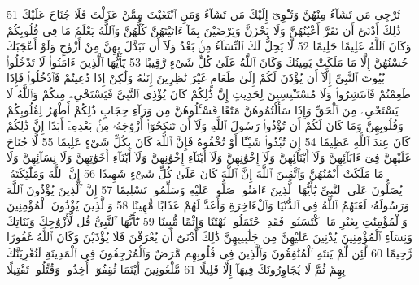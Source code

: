 {\tiny\colorbox{cl_aya}{51}} تُرْجِى مَن تَشَآءُ مِنْهُنَّ وَتُـْٔوِىٓ إِلَيْكَ مَن تَشَآءُ وَمَنِ ٱبْتَغَيْتَ مِمَّنْ عَزَلْتَ فَلَا جُنَاحَ عَلَيْكَ ذَٰلِكَ أَدْنَىٰٓ أَن تَقَرَّ أَعْيُنُهُنَّ وَلَا يَحْزَنَّ وَيَرْضَيْنَ بِمَآ ءَاتَيْتَهُنَّ كُلُّهُنَّ وَٱللَّهُ يَعْلَمُ مَا فِى قُلُوبِكُمْ وَكَانَ ٱللَّهُ عَلِيمًا حَلِيمًا
{\tiny\colorbox{cl_aya}{52}} لَّا يَحِلُّ لَكَ ٱلنِّسَآءُ مِنۢ بَعْدُ وَلَآ أَن تَبَدَّلَ بِهِنَّ مِنْ أَزْوَٰجٍ وَلَوْ أَعْجَبَكَ حُسْنُهُنَّ إِلَّا مَا مَلَكَتْ يَمِينُكَ وَكَانَ ٱللَّهُ عَلَىٰ كُلِّ شَىْءٍ رَّقِيبًا
{\tiny\colorbox{cl_aya}{53}} يَٰٓأَيُّهَا ٱلَّذِينَ ءَامَنُوا۟ لَا تَدْخُلُوا۟ بُيُوتَ ٱلنَّبِىِّ إِلَّآ أَن يُؤْذَنَ لَكُمْ إِلَىٰ طَعَامٍ غَيْرَ نَٰظِرِينَ إِنَىٰهُ وَلَٰكِنْ إِذَا دُعِيتُمْ فَٱدْخُلُوا۟ فَإِذَا طَعِمْتُمْ فَٱنتَشِرُوا۟ وَلَا مُسْتَـْٔنِسِينَ لِحَدِيثٍ إِنَّ ذَٰلِكُمْ كَانَ يُؤْذِى ٱلنَّبِىَّ فَيَسْتَحْىِۦ مِنكُمْ وَٱللَّهُ لَا يَسْتَحْىِۦ مِنَ ٱلْحَقِّ وَإِذَا سَأَلْتُمُوهُنَّ مَتَٰعًا فَسْـَٔلُوهُنَّ مِن وَرَآءِ حِجَابٍ ذَٰلِكُمْ أَطْهَرُ لِقُلُوبِكُمْ وَقُلُوبِهِنَّ وَمَا كَانَ لَكُمْ أَن تُؤْذُوا۟ رَسُولَ ٱللَّهِ وَلَآ أَن تَنكِحُوٓا۟ أَزْوَٰجَهُۥ مِنۢ بَعْدِهِۦٓ أَبَدًا إِنَّ ذَٰلِكُمْ كَانَ عِندَ ٱللَّهِ عَظِيمًا
{\tiny\colorbox{cl_aya}{54}} إِن تُبْدُوا۟ شَيْـًٔا أَوْ تُخْفُوهُ فَإِنَّ ٱللَّهَ كَانَ بِكُلِّ شَىْءٍ عَلِيمًا
{\tiny\colorbox{cl_aya}{55}} لَّا جُنَاحَ عَلَيْهِنَّ فِىٓ ءَابَآئِهِنَّ وَلَآ أَبْنَآئِهِنَّ وَلَآ إِخْوَٰنِهِنَّ وَلَآ أَبْنَآءِ إِخْوَٰنِهِنَّ وَلَآ أَبْنَآءِ أَخَوَٰتِهِنَّ وَلَا نِسَآئِهِنَّ وَلَا مَا مَلَكَتْ أَيْمَٰنُهُنَّ وَٱتَّقِينَ ٱللَّهَ إِنَّ ٱللَّهَ كَانَ عَلَىٰ كُلِّ شَىْءٍ شَهِيدًا
{\tiny\colorbox{cl_aya}{56}} إِنَّ ٱللَّهَ وَمَلَٰٓئِكَتَهُۥ يُصَلُّونَ عَلَى ٱلنَّبِىِّ يَٰٓأَيُّهَا ٱلَّذِينَ ءَامَنُوا۟ صَلُّوا۟ عَلَيْهِ وَسَلِّمُوا۟ تَسْلِيمًا
{\tiny\colorbox{cl_aya}{57}} إِنَّ ٱلَّذِينَ يُؤْذُونَ ٱللَّهَ وَرَسُولَهُۥ لَعَنَهُمُ ٱللَّهُ فِى ٱلدُّنْيَا وَٱلْءَاخِرَةِ وَأَعَدَّ لَهُمْ عَذَابًا مُّهِينًا
{\tiny\colorbox{cl_aya}{58}} وَٱلَّذِينَ يُؤْذُونَ ٱلْمُؤْمِنِينَ وَٱلْمُؤْمِنَٰتِ بِغَيْرِ مَا ٱكْتَسَبُوا۟ فَقَدِ ٱحْتَمَلُوا۟ بُهْتَٰنًا وَإِثْمًا مُّبِينًا
{\tiny\colorbox{cl_aya}{59}} يَٰٓأَيُّهَا ٱلنَّبِىُّ قُل لِّأَزْوَٰجِكَ وَبَنَاتِكَ وَنِسَآءِ ٱلْمُؤْمِنِينَ يُدْنِينَ عَلَيْهِنَّ مِن جَلَٰبِيبِهِنَّ ذَٰلِكَ أَدْنَىٰٓ أَن يُعْرَفْنَ فَلَا يُؤْذَيْنَ وَكَانَ ٱللَّهُ غَفُورًا رَّحِيمًا
{\tiny\colorbox{cl_aya}{60}} لَّئِن لَّمْ يَنتَهِ ٱلْمُنَٰفِقُونَ وَٱلَّذِينَ فِى قُلُوبِهِم مَّرَضٌ وَٱلْمُرْجِفُونَ فِى ٱلْمَدِينَةِ لَنُغْرِيَنَّكَ بِهِمْ ثُمَّ لَا يُجَاوِرُونَكَ فِيهَآ إِلَّا قَلِيلًا
{\tiny\colorbox{cl_aya}{61}} مَّلْعُونِينَ أَيْنَمَا ثُقِفُوٓا۟ أُخِذُوا۟ وَقُتِّلُوا۟ تَقْتِيلًا

